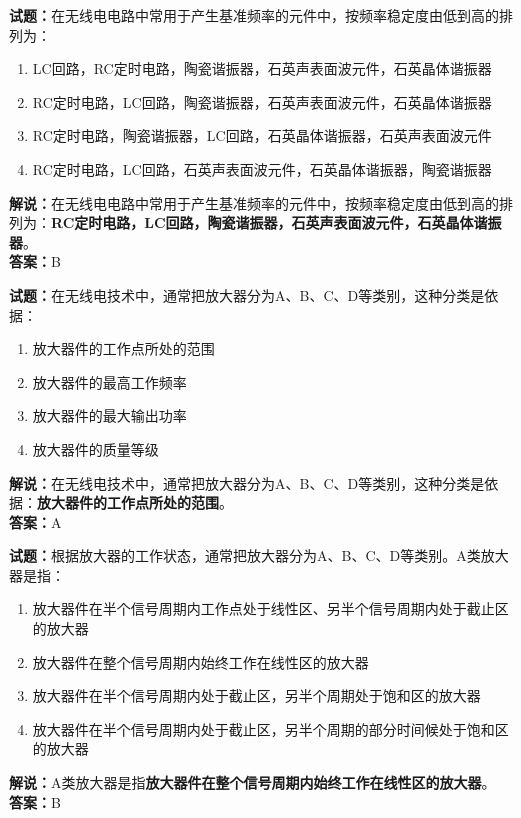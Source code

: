 \documentclass{ctexbook}
\begin{document}
\vspace{1em}

\textbf{试题：}在无线电电路中常用于产生基准频率的元件中，按频率稳定度由低到高的排列为：
\begin{enumerate}[leftmargin=3em]
  \item LC回路，RC定时电路，陶瓷谐振器，石英声表面波元件，石英晶体谐振器
  \item RC定时电路，LC回路，陶瓷谐振器，石英声表面波元件，石英晶体谐振器
  \item RC定时电路，陶瓷谐振器，LC回路，石英晶体谐振器，石英声表面波元件
  \item RC定时电路，LC回路，石英声表面波元件，石英晶体谐振器，陶瓷谐振器
\end{enumerate}
\noindent\textbf{解说：}在无线电电路中常用于产生基准频率的元件中，按频率稳定度由低到高的排列为：\textbf{RC定时电路，LC回路，陶瓷谐振器，石英声表面波元件，石英晶体谐振器}。\\\noindent\textbf{答案：}B

\vspace{1em}

\textbf{试题：}在无线电技术中，通常把放大器分为A、B、C、D等类别，这种分类是依据：
\begin{enumerate}[leftmargin=3em]
  \item 放大器件的工作点所处的范围
  \item 放大器件的最高工作频率
  \item 放大器件的最大输出功率
  \item 放大器件的质量等级
\end{enumerate}
\noindent\textbf{解说：}在无线电技术中，通常把放大器分为A、B、C、D等类别，这种分类是依据：\textbf{放大器件的工作点所处的范围}。\\\noindent\textbf{答案：}A

\vspace{1em}

\textbf{试题：}根据放大器的工作状态，通常把放大器分为A、B、C、D等类别。A类放大器是指：
\begin{enumerate}[leftmargin=3em]
  \item 放大器件在半个信号周期内工作点处于线性区、另半个信号周期内处于截止区的放大器
  \item 放大器件在整个信号周期内始终工作在线性区的放大器
  \item 放大器件在半个信号周期内处于截止区，另半个周期处于饱和区的放大器
  \item 放大器件在半个信号周期内处于截止区，另半个周期的部分时间候处于饱和区的放大器
\end{enumerate}
\noindent\textbf{解说：}A类放大器是指\textbf{放大器件在整个信号周期内始终工作在线性区的放大器}。\\\noindent\textbf{答案：}B
\end{document}

